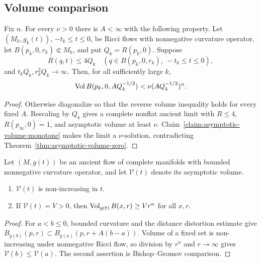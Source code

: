 \subsection{Volume comparison}

\begin{proposition}\label{prop:volume-comparison-bound}
\label{volcomp}

Fix $n$. For every $\nu>0$ there is $A<\infty$ with the following
property. Let $(M_k,g_k(t))$, $-t_k\leq t\leq0$, be Ricci flows with
nonnegative curvature operator, let
$B(p_k,0,r_k)\Subset M_k$, and put $Q_k=R(p_k,0)$. Suppose
\[
 R(q,t)\leq4Q_k
 \quad(q\in B(p_k,0,r_k),\ -t_k\leq t\leq0),
\]
and $t_kQ_k,r_k^2Q_k\to\infty$. Then, for all sufficiently large
$k$,
\[
 \operatorname{Vol} B(p_k,0,AQ_k^{-1/2})
 <\nu(AQ_k^{-1/2})^n.
\]
\end{proposition}
\begin{proof}
\sketch
{}
Otherwise diagonalize so that the reverse volume inequality holds
for every fixed $A$. Rescaling by $Q_k$ gives a complete nonflat
ancient limit with $R\leq4$, $R(p_\infty,0)=1$, and asymptotic
volume at least $\nu$. Claim~\ref{claim:asymptotic-volume-monotone}
makes the limit a $\nu$-solution, contradicting
Theorem~\ref{thm:asymptotic-volume-zero}.
\end{proof}

\begin{claim}\label{claim:asymptotic-volume-monotone}
Let $(M,g(t))$ be an ancient flow of complete manifolds with bounded
nonnegative curvature operator, and let $\mathcal V(t)$ denote its
asymptotic volume.
\begin{enumerate}
\item[(1)] $\mathcal V(t)$ is non-increasing in $t$.
\item[(2)] If $\mathcal V(t)=V>0$, then
$\operatorname{Vol}_{g(t)}B(x,r)\geq Vr^n$ for all $x,r$.
\end{enumerate}
\end{claim}
\begin{proof}
\sketch For $a<b\leq0$, bounded curvature and the distance
distortion estimate give
$B_{g(b)}(p,r)\subset B_{g(a)}(p,r+A(b-a))$. Volume of a fixed set
is non-increasing under nonnegative Ricci flow, so division by
$r^n$ and $r\to\infty$ gives
$\mathcal V(b)\leq\mathcal V(a)$. The second assertion is
Bishop--Gromov comparison.
\end{proof}

